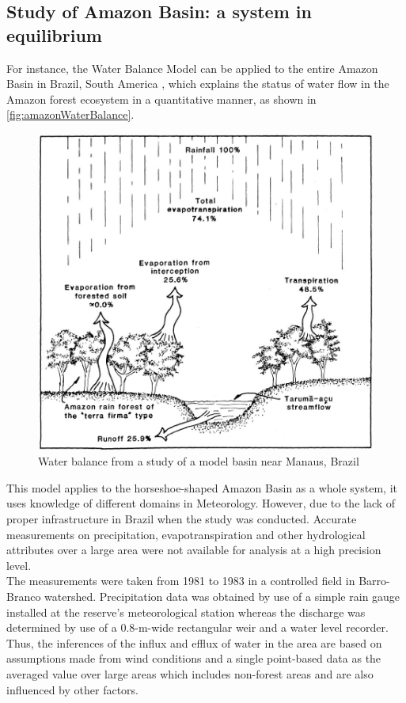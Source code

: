 \subsection{Study of Amazon Basin: a system in equilibrium}
For instance, the Water Balance Model can be applied to the entire Amazon Basin in Brazil, South America  \citep{Salati1984a}, which explains the status of water flow in the Amazon forest ecosystem in a quantitative manner, as shown in \autoref{fig:amazonWaterBalance}. 
\begin{figure}[bth]
\begin{center}
\includegraphics[width=.75\linewidth]{gfx/amazonWaterBalance}
\end{center}
\caption{Water balance from a study of a model basin near Manaus, Brazil\citep{Leopoldo1982}}
\label{fig:amazonWaterBalance}
\end{figure}
\newline
This model applies to the horseshoe-shaped Amazon Basin as a whole system, it uses knowledge of different domains in Meteorology. However, due to the lack of proper infrastructure in Brazil when the study was conducted. Accurate measurements on precipitation, evapotranspiration and other hydrological attributes over a large area were not available for analysis at a high precision level. \\
\newline
The measurements were taken from 1981 to 1983 in a controlled field in Barro-Branco watershed\citep{Leopoldo1995}. Precipitation data was obtained by use of a simple rain gauge installed at the reserve's meteorological station whereas the discharge was determined by use of a 0.8-m-wide rectangular weir and a water level recorder. Thus, the inferences of the influx and efflux of water in the area are based on assumptions made from wind conditions and a single point-based data as the averaged value over large areas which includes non-forest areas and are also influenced by other factors. 

